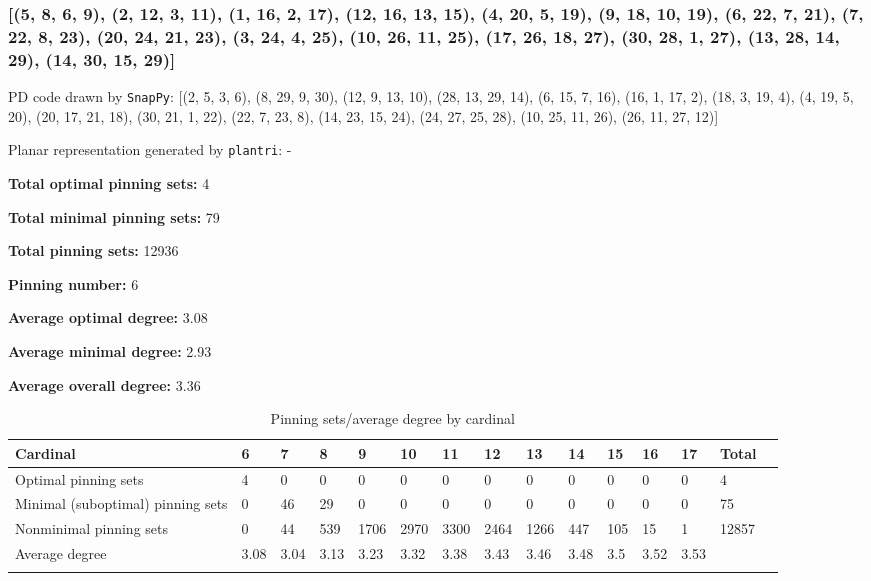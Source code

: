 \documentclass{article}%
\begin{document}
\newpage

\subsubsection{[(5, 8, 6, 9), (2, 12, 3, 11), (1, 16, 2, 17), (12, 16, 13, 15), (4, 20, 5, 19), (9, 18, 10, 19), (6, 22, 7, 21), (7, 22, 8, 23), (20, 24, 21, 23), (3, 24, 4, 25), (10, 26, 11, 25), (17, 26, 18, 27), (30, 28, 1, 27), (13, 28, 14, 29), (14, 30, 15, 29)]}

{\small\noindent PD code drawn by \texttt{SnapPy}: [(2, 5, 3, 6), (8, 29, 9, 30), (12, 9, 13, 10), (28, 13, 29, 14), (6, 15, 7, 16), (16, 1, 17, 2), (18, 3, 19, 4), (4, 19, 5, 20), (20, 17, 21, 18), (30, 21, 1, 22), (22, 7, 23, 8), (14, 23, 15, 24), (24, 27, 25, 28), (10, 25, 11, 26), (26, 11, 27, 12)]}

{\small\noindent Planar representation generated by \texttt{plantri}: -}

\begin{multicols}{2}
{\normalsize \noindent\textbf{Total optimal pinning sets:} 4

\noindent\textbf{Total minimal pinning sets:} 79

\noindent\textbf{Total pinning sets:} 12936

\noindent\textbf{Pinning number:} 6

}
\columnbreak

{\normalsize \noindent\textbf{Average optimal degree:} 3.08

\noindent\textbf{Average minimal degree:} 2.93

\noindent\textbf{Average overall degree:} 3.36

}
\end{multicols}

\begin{table}[ht]
	\caption{Pinning sets/average degree by cardinal}
	\centering
	\renewcommand{\arraystretch}{1.5}
	\begin{tabularx}{\textwidth}{lXXXXXXXXXXXXXX}
		\toprule
			Cardinal & 6 & 7 & 8 & 9 & 10 & 11 & 12 & 13 & 14 & 15 & 16 & 17 & Total\\
			\hline
			Optimal pinning sets & 4 & 0 & 0 & 0 & 0 & 0 & 0 & 0 & 0 & 0 & 0 & 0 & 4 \\
			Minimal (suboptimal) pinning sets & 0 & 46 & 29 & 0 & 0 & 0 & 0 & 0 & 0 & 0 & 0 & 0 & 75 \\
			Nonminimal pinning sets & 0 & 44 & 539 & 1706 & 2970 & 3300 & 2464 & 1266 & 447 & 105 & 15 & 1 & 12857 \\
			Average degree & 3.08 & 3.04 & 3.13 & 3.23 & 3.32 & 3.38 & 3.43 & 3.46 & 3.48 & 3.5 & 3.52 & 3.53 &  \\
		\bottomrule \\ 
	\end{tabularx}
\end{table}
\end{document}
